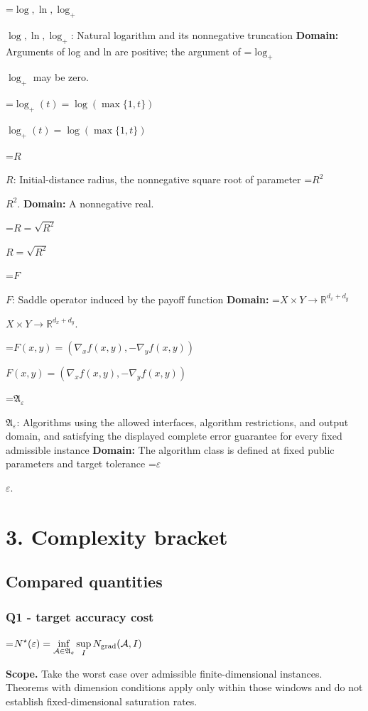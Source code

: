 \documentclass[10pt,a4paper]{article}
\newcommand{\AtlasMath}[1]{\par\begingroup\centering\setbox0=\hbox{$\displaystyle #1$}\ifdim\wd0>1.4\linewidth\typeout{ATLAS WIDE FORMULA: \the\wd0}\fi\ifdim\wd0>\linewidth\resizebox{\linewidth}{!}{\box0}\else\box0\fi\par\endgroup}
\newcommand{\AtlasInlineMath}[1]{\begingroup\setbox0=\hbox{$#1$}\ifdim\wd0>.4\linewidth\endgroup\AtlasMath{#1}\else\endgroup$#1$\fi}
\begin{document}
\AtlasInlineMath{\log,\ln,\log_+}: Natural logarithm and its nonnegative truncation \textbf{Domain:} Arguments of log and ln are positive; the argument of \AtlasInlineMath{\log_+} may be zero.



\AtlasInlineMath{\log_+(t)=\log(\max\{1,t\})}



\AtlasInlineMath{R}: Initial-distance radius, the nonnegative square root of parameter \AtlasInlineMath{R^2}. \textbf{Domain:} A nonnegative real.



\AtlasInlineMath{R=\sqrt{R^2}}



\AtlasInlineMath{F}: Saddle operator induced by the payoff function \textbf{Domain:} \AtlasInlineMath{X\times Y\to\mathbb R^{d_x+d_y}}.



\AtlasInlineMath{F(x,y)=(\nabla_xf(x,y),-\nabla_yf(x,y))}



\AtlasInlineMath{\mathfrak A_\varepsilon}: Algorithms using the allowed interfaces, algorithm restrictions, and output domain, and satisfying the displayed complete error guarantee for every fixed admissible instance \textbf{Domain:} The algorithm class is defined at fixed public parameters and target tolerance \AtlasInlineMath{\varepsilon}.



\section{3. Complexity bracket}


\subsection{Compared quantities}


\subsubsection{Q1 - target accuracy cost}


\AtlasMath{N^\star(\varepsilon)=\inf_{\mathcal A\in\mathfrak A_\varepsilon}\sup_I N_{\rm grad}(\mathcal A,I)}


\textbf{Scope.} Take the worst case over admissible finite-dimensional instances. Theorems with dimension conditions apply only within those windows and do not establish fixed-dimensional saturation rates.
\end{document}
